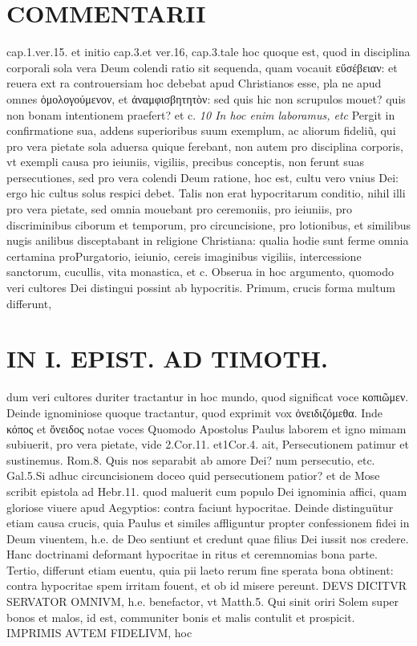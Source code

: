 \documentclass{article}
\begin{document}
\begin{pages}
\section*{COMMENTARII }
\marginpar{[ p.102 ]}\pstart cap.1.ver.15. et initio cap.3.et ver.16, cap.3.tale hoc quoque est, quod in disciplina corporali sola vera Deum colendi ratio sit sequenda, quam vocauit εὔσέβειαν: et reuera ext ra controuersiam hoc debebat apud Christianos esse, pla ne apud omnes ὁμολογούμενον, et ἀναμφισβητητὸν: sed quis hic non scrupulos mouet? quis non bonam intentionem praefert? et c.  \pend
\textit{10 In hoc enim laboramus, etc }\pstart Pergit in confirmatione sua, addens superioribus suum exemplum, ac aliorum fideliũ, qui pro vera pietate sola aduersa quique ferebant, non autem pro disciplina corporis, vt exempli causa pro ieiuniis, vigiliis, precibus conceptis, non ferunt suas persecutiones, sed pro vera colendi Deum ratione, hoc est, cultu vero vnius Dei: ergo hic cultus solus respici debet. Talis non erat hypocritarum conditio, nihil illi pro vera pietate, sed omnia mouebant pro ceremoniis, pro ieiuniis, pro discriminibus  ciborum et temporum, pro circuncisione, pro lotionibus, et similibus nugis anilibus disceptabant in religione Christiana: qualia hodie sunt ferme omnia certamina proPurgatorio, ieiunio, cereis imaginibus  vigiliis, intercessione sanctorum, cucullis, vita monastica, et c. Obserua in hoc argumento, quomodo veri cultores Dei distingui possint ab hypocritis. Primum, crucis forma multum differunt,  \pend
\section*{IN I. EPIST. AD TIMOTH. }
\marginpar{[ p.103 ]}\pstart dum veri cultores duriter tractantur in hoc mundo, quod significat voce κοπιῶμεν. Deinde ignominiose quoque tractantur, quod exprimit vox ὀνειδιζόμεθα. Inde κόπος et ὄνειδος notae voces  \pend\pstart Quomodo Apostolus Paulus laborem et igno mimam subiuerit, pro vera pietate, vide 2.Cor.11. et1Cor.4. ait, Persecutionem patimur et sustinemus. Rom.8. Quis nos separabit ab amore Dei? num persecutio, etc. Gal.5.Si adhuc circuncisionem doceo quid persecutionem patior? et de Mose scribit epistola ad Hebr.11. quod maluerit cum populo Dei ignominia affici, quam gloriose viuere apud Aegyptios: contra faciunt hypocritae.  \pend\pstart Deinde distinguütur etiam causa crucis, quia Paulus et similes affliguntur propter confessionem fidei in Deum viuentem, h.e. de Deo sentiunt et credunt quae filius Dei iussit nos credere. Hanc doctrinami deformant hypocritae in ritus et ceremnomias bona parte.  \pend\pstart Tertio, differunt etiam euentu, quia pii laeto rerum fine sperata bona obtinent: contra hypocritae spem irritam fouent, et ob id misere pereunt.  \pend\pstart DEVS DICITVR SERVATOR OMNIVM, h.e. benefactor, vt Matth.5. Qui sinit oriri Solem super bonos et malos, id est, communiter bonis et malis contulit et prospicit. IMPRIMIS AVTEM FIDELIVM, hoc  \pend

\end{pages}
\end{document}
